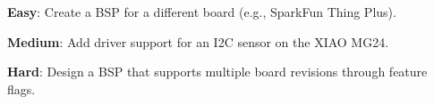 \begin{exercises}
    \item\textbf{Easy}: Create a BSP for a different board (e.g., SparkFun Thing Plus).
    
    \item\textbf{Medium}: Add driver support for an I2C sensor on the XIAO MG24.
    
    \item\textbf{Hard}: Design a BSP that supports multiple board revisions through feature flags.
\end{exercises}
